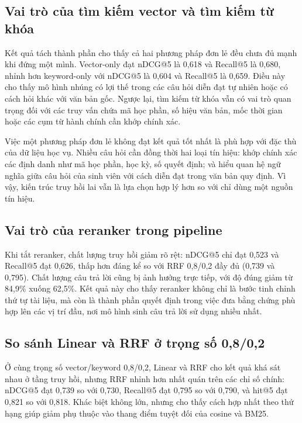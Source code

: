\documentclass[../DoAn.tex]{subfiles}
\begin{document}
\subsection{Vai trò của tìm kiếm vector và tìm kiếm từ khóa}

Kết quả tách thành phần cho thấy cả hai phương pháp đơn lẻ đều chưa đủ mạnh
khi đứng một mình. Vector-only đạt nDCG@5 là 0,618 và Recall@5 là 0,680, nhỉnh
hơn keyword-only với nDCG@5 là 0,604 và Recall@5 là 0,659. Điều này cho thấy
mô hình nhúng có lợi thế trong các câu hỏi diễn đạt tự nhiên hoặc có cách hỏi
khác với văn bản gốc. Ngược lại, tìm kiếm từ khóa vẫn có vai trò quan trọng đối
với các truy vấn chứa mã học phần, số hiệu văn bản, mốc thời gian hoặc các cụm
từ hành chính cần khớp chính xác.

Việc một phương pháp đơn lẻ không đạt kết quả tốt nhất là phù hợp với đặc thù
của dữ liệu học vụ. Nhiều câu hỏi cần đồng thời hai loại tín hiệu: khớp chính
xác các định danh như mã học phần, học kỳ, số quyết định; và hiểu quan hệ ngữ
nghĩa giữa câu hỏi của sinh viên với cách diễn đạt trong văn bản quy định. Vì
vậy, kiến trúc truy hồi lai vẫn là lựa chọn hợp lý hơn so với chỉ dùng một
nguồn tín hiệu.

\subsection{Vai trò của reranker trong pipeline}

Khi tắt reranker, chất lượng truy hồi giảm rõ rệt: nDCG@5 chỉ đạt 0,523 và
Recall@5 đạt 0,626, thấp hơn đáng kể so với RRF 0,8/0,2 đầy đủ (0,739 và
0,795). Chất lượng câu trả lời cũng bị ảnh hưởng trực tiếp, với độ đúng giảm
từ 84,9\% xuống 62,5\%. Kết quả này cho thấy reranker không chỉ là bước tinh
chỉnh thứ tự tài liệu, mà còn là thành phần quyết định trong việc đưa bằng
chứng phù hợp lên các vị trí đầu, nơi mô hình sinh câu trả lời sử dụng nhiều
nhất.

\subsection{So sánh Linear và RRF ở trọng số 0,8/0,2}

Ở cùng trọng số vector/keyword 0,8/0,2, Linear và RRF cho kết quả khá sát nhau
ở tầng truy hồi, nhưng RRF nhỉnh hơn nhất quán trên các chỉ số chính: nDCG@5
đạt 0,739 so với 0,730, Recall@5 đạt 0,795 so với 0,790, và hit@5 đạt 0,821
so với 0,818. Khác biệt không lớn, nhưng cho thấy cách hợp nhất theo thứ hạng
giúp giảm phụ thuộc vào thang điểm tuyệt đối của cosine và BM25.
\end{document}
